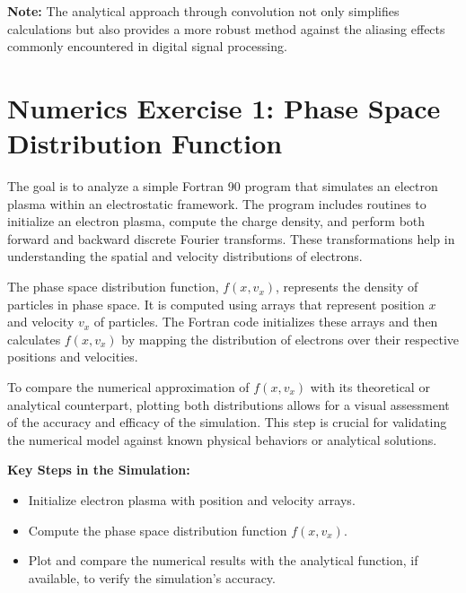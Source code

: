 \documentclass{article}
\begin{document}
\vspace{3mm}

\textbf{Note:} The analytical approach through convolution not only simplifies calculations but also provides a more robust method against the aliasing effects commonly encountered in digital signal processing.

\section*{Numerics Exercise 1: Phase Space Distribution Function}

The goal is to analyze a simple Fortran 90 program that simulates an electron plasma within an electrostatic framework. The program includes routines to initialize an electron plasma, compute the charge density, and perform both forward and backward discrete Fourier transforms. These transformations help in understanding the spatial and velocity distributions of electrons.

The phase space distribution function, \( f(x, v_x) \), represents the density of particles in phase space. It is computed using arrays that represent position \( x \) and velocity \( v_x \) of particles. The Fortran code initializes these arrays and then calculates \( f(x, v_x) \) by mapping the distribution of electrons over their respective positions and velocities.

To compare the numerical approximation of \( f(x, v_x) \) with its theoretical or analytical counterpart, plotting both distributions allows for a visual assessment of the accuracy and efficacy of the simulation. This step is crucial for validating the numerical model against known physical behaviors or analytical solutions.

\vspace{3mm}

\textbf{Key Steps in the Simulation:}
\begin{itemize}
    \item Initialize electron plasma with position and velocity arrays.
    \item Compute the phase space distribution function \( f(x, v_x) \).
    \item Plot and compare the numerical results with the analytical function, if available, to verify the simulation's accuracy.
\end{itemize}
\end{document}
